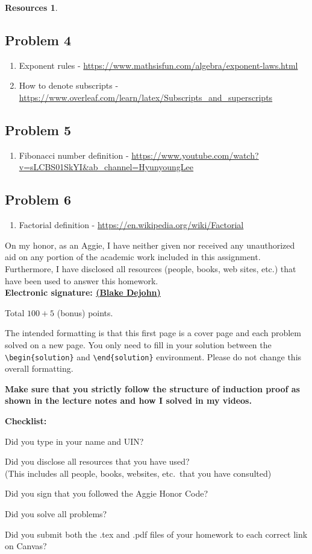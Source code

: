 \documentclass{article}
\theoremstyle{definition}
\newtheorem*{solution}{Solution}
\newtheorem*{resources}{Resources}
\newcommand{\honor}{\noindent On my honor, as an Aggie, I have neither
  given nor received any unauthorized aid on any portion of the
  academic work included in this assignment. Furthermore, I have
  disclosed all resources (people, books, web sites, etc.) that have
  been used to answer this homework. \\[2ex]
 \textbf{Electronic signature: \underline{ (Blake Dejohn) } } } %
\newcommand{\checklist}{\noindent\textbf{Checklist:}
\begin{compactitem}[$\Box$] 
\item [\checkmark] Did you type in your name and UIN? 
\item [\checkmark] Did you disclose all resources that you have used? \\
(This includes all people, books, websites, etc.\ that you have consulted)
\item [\checkmark] Did you sign that you followed the Aggie Honor Code? 
\item [\checkmark] Did you solve all problems? 
\item [\checkmark] Did you submit both the .tex and .pdf files of your homework to each correct link on Canvas? 
\end{compactitem}
}
\begin{document}
\begin{resources}
\subsection*{Problem 4}
\begin{enumerate}
\item Exponent rules - \url{https://www.mathsisfun.com/algebra/exponent-laws.html}
\item How to denote subscripts - \url{https://www.overleaf.com/learn/latex/Subscripts_and_superscripts}
\end{enumerate}
\subsection*{Problem 5}
\begin{enumerate}
\item Fibonacci number definition - \url{https://www.youtube.com/watch?v=sLCBS01SkYI&ab_channel=HyunyoungLee}
\end{enumerate}
\subsection*{Problem 6}
\begin{enumerate}
\item Factorial definition - \url{https://en.wikipedia.org/wiki/Factorial}
\end{enumerate}
\end{resources}
\honor

\bigskip

\noindent
Total $100 + 5$ (bonus) points.

\bigskip

\noindent
The intended formatting is that this first page is a cover page and each 
problem solved on a new page. You only need to fill in your solution between 
the \verb|\begin{solution}| and \verb|\end{solution}| environment.  
Please do not change this overall formatting.

\bigskip

\noindent
\textbf{Make sure that you strictly follow the structure of induction proof as shown in the 
lecture notes and how I solved in my videos.}

\vfill
\checklist
\end{document}

